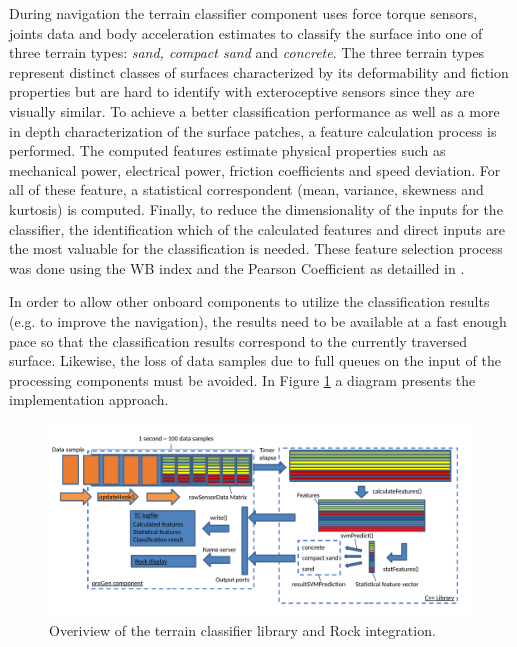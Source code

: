 \documentclass{article}
\begin{document}
During navigation the terrain classifier component uses force torque sensors, joints data and body acceleration estimates to classify the surface into one of three terrain types: \emph{sand, compact sand} and \emph{concrete}.
The three terrain types represent distinct classes of surfaces characterized by its deformability and fiction properties but are hard to identify with exteroceptive sensors since they are visually similar.
To achieve a better classification performance as well as a more in depth characterization of the surface patches, a feature calculation process is performed.
The computed features estimate physical properties such as mechanical power, electrical power, friction coefficients and speed deviation. 
For all of these feature, a statistical correspondent (mean, variance, skewness and kurtosis) is computed. 
Finally, to reduce the dimensionality of the inputs for the classifier, the identification which of the calculated features and direct inputs are the most valuable for the classification is needed.  
These feature selection process was done using the WB index and the Pearson Coefficient as detailled in \cite{Dimastrogiovanni2020}. 

In order to allow other onboard components to utilize the classification results (e.g. to improve the navigation), the results need to be available at a fast enough pace so that the classification results correspond to the currently traversed surface. 
Likewise, the loss of data samples due to full queues on the input of the processing components must be avoided. 
In Figure \ref{fig:overview} a diagram presents the implementation approach.

\begin{figure}
\centering
\includegraphics[width=\textwidth]{../figures/OverviewTC2.pdf}
\caption{\label{fig:overview}Overiview of the terrain classifier library and Rock integration.}
\end{figure}
\end{document}
